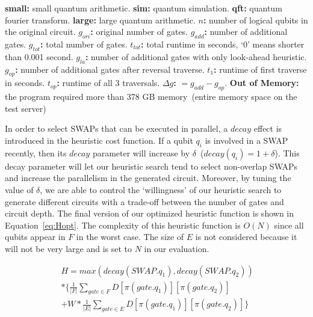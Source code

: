 \documentclass[journal,10pt,twocolumn]{IEEEtran}
\begin{document}
\begin{table}[!t]
    \begin{scriptsize}
    \begin{tablenotes}
\item 
\textbf{small:} small quantum arithmetic. 
\textbf{sim:} quantum simulation. 
\textbf{qft:} quantum fourier transform. 
\textbf{large:} large quantum arithmetic. 
\textbf{$n$:} number of logical qubits in the original circuit. 
\textbf{$g_{ori}$:} original number of gates. 
\textbf{$g_{add}$:} number of additional gates. 
\textbf{$g_{tot}$:} total number of gates. 
\textbf{$t_{tot}$:} total runtime in seconds, `0' means shorter than 0.001 second. 
\textbf{$g_{la}$:} number of additional gates with only look-ahead heuristic. 
\textbf{$g_{op}$:} number of additional gates after reversal traverse. 
\textbf{$t_{1}$:} runtime of first traverse in seconds. 
\textbf{$t_{op}$:} runtime of all 3 traversals. 
\textbf{$\Delta g$:} $=g_{add}-g_{op}$. 
\textbf{Out of Memory:} the program required more than 378 GB memory~(entire memory space on the test server) 
 \end{tablenotes}
 \end{scriptsize}
    
  \label{tab:result}%
\end{table}%


In order to select SWAPs that can be executed in parallel, a $decay$ effect is introduced in the heuristic cost function. 
If a qubit $q_{i}$ is involved in a SWAP recently, then its $decay$ parameter will increase by $\delta$~($decay(q_{i}) = 1 + \delta$).
This decay parameter will let our heuristic search tend to select non-overlap SWAPs and increase the parallelism in the generated circuit. 
Moreover, by tuning the value of $\delta$, we are able to control the `willingness' of our heuristic search to generate different circuits with a trade-off between the number of gates and circuit depth. 
The final version of our optimized heuristic function is shown in Equation~\ref{eq:Hopt}.
The complexity of this heuristic function is $O(N)$ since all qubits appear in $F$ in the worst case. 
The size of $E$ is not considered because it will not be very large and is set to $N$ in our evaluation.

\begin{equation}~\label{eq:Hopt}
\begin{aligned}
H = max(decay(SWAP.q_1), decay(SWAP.q_2)) \\
*\{\frac{1}{|F|}\sum_{gate \in F}D[\pi(gate.q_1)][\pi(gate.q_2)] \\
+ W * \frac{1}{|E|}\sum_{gate \in E}D[\pi(gate.q_1)][\pi(gate.q_2)]\}
\end{aligned}
\end{equation}
\end{document}
